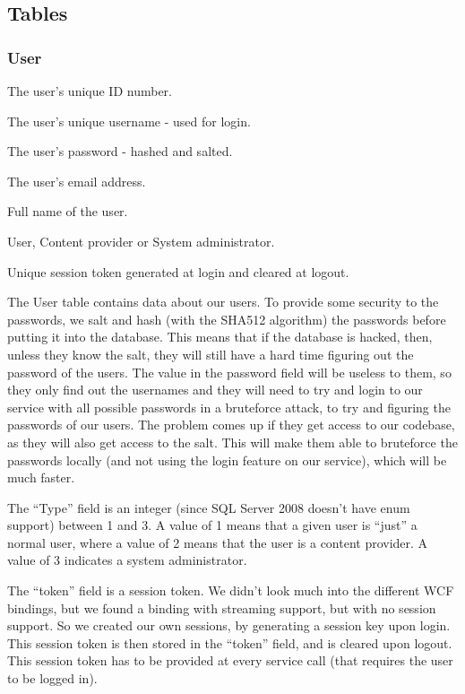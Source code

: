 \subsection{Tables}
\label{Design_Database_Tables}

\subsubsection{User}
\label{Design_Database_Tables_User}

\begin{my_description}
\item[user\_id] The user's unique ID number.
\item[username] The user's unique username - used for login.
\item[password] The user's password - hashed and salted.
\item[email] The user's email address.
\item[full\_name] Full name of the user.
\item[type] User, Content provider or System administrator.
\item[token] Unique session token generated at login and cleared at logout.
\end{my_description}

The User table contains data about our users. To provide some security to the passwords, we salt and hash (with the SHA512 algorithm) the passwords before putting it into the database. This means that if the database is hacked, then, unless they know the salt, they will still have a hard time figuring out the password of the users. The value in the password field will be useless to them, so they only find out the usernames and they will need to try and login to our service with all possible passwords in a bruteforce attack, to try and figuring the passwords of our users. The problem comes up if they get access to our codebase, as they will also get access to the salt. This will make them able to bruteforce the passwords locally (and not using the login feature on our service), which will be much faster.

The ``Type'' field is an integer (since SQL Server 2008 doesn't have enum support) between 1 and 3. A value of 1 means that a given user is ``just'' a normal user, where a value of 2 means that the user is a content provider. A value of 3 indicates a system administrator.

The ``token'' field is a session token. We didn't look much into the different WCF bindings, but we found a binding with streaming support, but with no session support. So we created our own sessions, by generating a session key upon login. This session token is then stored in the ``token'' field, and is cleared upon logout. This session token has to be provided at every service call (that requires the user to be logged in).

